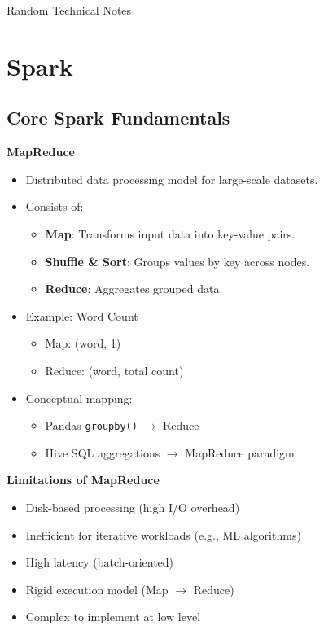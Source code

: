 \documentclass[10pt,a4paper]{article}
\begin{document}
	\begin{titlepage}
		\vspace*{0.25\textheight}
		{\LARGE \textcolor{accent}{Random Technical Notes}}\par
		\author{Thomaskutty Reji}
		\date{}
	\end{titlepage}
	\label{toc}
	\tableofcontents
	\newpage
	

	\section{Spark}
	\subsection{Core Spark Fundamentals}
	
	\textbf{MapReduce}
	\begin{itemize}
	    \item Distributed data processing model for large-scale datasets.
	    \item Consists of:
	    \begin{itemize}
	        \item \textbf{Map}: Transforms input data into key-value pairs.
	        \item \textbf{Shuffle \& Sort}: Groups values by key across nodes.
	        \item \textbf{Reduce}: Aggregates grouped data.
	    \end{itemize}
	    \item Example: Word Count
	    \begin{itemize}
	        \item Map: (word, 1)
	        \item Reduce: (word, total count)
	    \end{itemize}
	    \item Conceptual mapping:
	    \begin{itemize}
	        \item Pandas \texttt{groupby()} $\rightarrow$ Reduce
	        \item Hive SQL aggregations $\rightarrow$ MapReduce paradigm
	    \end{itemize}
	\end{itemize}
	
	\textbf{Limitations of MapReduce}
	\begin{itemize}
	    \item Disk-based processing (high I/O overhead)
	    \item Inefficient for iterative workloads (e.g., ML algorithms)
	    \item High latency (batch-oriented)
	    \item Rigid execution model (Map $\rightarrow$ Reduce)
	    \item Complex to implement at low level
	\end{itemize}
	
\end{document}
